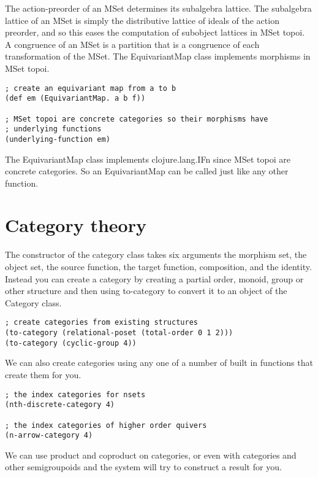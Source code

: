 \documentclass[a4paper,11pt]{report}
\begin{document}
The action-preorder of an MSet determines its subalgebra lattice. The subalgebra lattice of an MSet is simply the distributive lattice of ideals of the action preorder, and so this eases the computation of subobject lattices in MSet topoi. A congruence of an MSet is a partition that is a congruence of each transformation of the MSet. The EquivariantMap class implements morphisms in MSet topoi.

\lstset {language=Lisp}
\begin{lstlisting}
; create an equivariant map from a to b
(def em (EquivariantMap. a b f))

; MSet topoi are concrete categories so their morphisms have
; underlying functions
(underlying-function em)
\end{lstlisting}

The EquivariantMap class implements clojure.lang.IFn since MSet topoi are concrete categories. So an EquivariantMap can be called just like any other function.

\newpage 

\section{Category theory}
The constructor of the category class takes six arguments the morphism set, the object set, the source function, the target function, composition, and the identity. Instead you can create a category by creating a partial order, monoid, group or other structure and then using to-category to convert it to an object of the Category class.

\lstset {language=Lisp}
\begin{lstlisting}
; create categories from existing structures
(to-category (relational-poset (total-order 0 1 2)))
(to-category (cyclic-group 4))
\end{lstlisting}

We can also create categories using any one of a number of built in functions that create them for you.

\lstset {language=Lisp}
\begin{lstlisting}
; the index categories for nsets
(nth-discrete-category 4)

; the index categories of higher order quivers
(n-arrow-category 4)
\end{lstlisting}

We can use product and coproduct on categories, or even with categories and other semigroupoids and the system will try to construct a result for you.
\end{document}
